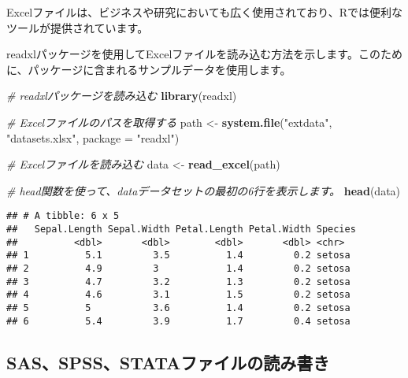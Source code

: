 \documentclass[
]{article}
\newenvironment{Shaded}{\begin{snugshade}}{\end{snugshade}}
\newcommand{\AttributeTok}[1]{\textcolor[rgb]{0.13,0.29,0.53}{#1}}
\newcommand{\CommentTok}[1]{\textcolor[rgb]{0.56,0.35,0.01}{\textit{#1}}}
\newcommand{\FunctionTok}[1]{\textcolor[rgb]{0.13,0.29,0.53}{\textbf{#1}}}
\newcommand{\NormalTok}[1]{#1}
\newcommand{\OtherTok}[1]{\textcolor[rgb]{0.56,0.35,0.01}{#1}}
\newcommand{\StringTok}[1]{\textcolor[rgb]{0.31,0.60,0.02}{#1}}
\begin{document}
Excelファイルは、ビジネスや研究においても広く使用されており、Rでは便利なツールが提供されています。

readxlパッケージを使用してExcelファイルを読み込む方法を示します。このために、パッケージに含まれるサンプルデータを使用します。

\begin{Shaded}
\begin{Highlighting}[]
\CommentTok{\# readxlパッケージを読み込む}
\FunctionTok{library}\NormalTok{(readxl)}

\CommentTok{\# Excelファイルのパスを取得する}
\NormalTok{path }\OtherTok{\textless{}{-}} \FunctionTok{system.file}\NormalTok{(}\StringTok{"extdata"}\NormalTok{, }\StringTok{"datasets.xlsx"}\NormalTok{, }\AttributeTok{package =} \StringTok{"readxl"}\NormalTok{)}

\CommentTok{\# Excelファイルを読み込む}
\NormalTok{data }\OtherTok{\textless{}{-}} \FunctionTok{read\_excel}\NormalTok{(path)}
\end{Highlighting}
\end{Shaded}

\begin{Shaded}
\begin{Highlighting}[]
\CommentTok{\# \textquotesingle{}head\textquotesingle{}関数を使って、\textquotesingle{}data\textquotesingle{}データセットの最初の6行を表示します。}
\FunctionTok{head}\NormalTok{(data)}
\end{Highlighting}
\end{Shaded}

\begin{verbatim}
## # A tibble: 6 x 5
##   Sepal.Length Sepal.Width Petal.Length Petal.Width Species
##          <dbl>       <dbl>        <dbl>       <dbl> <chr>  
## 1          5.1         3.5          1.4         0.2 setosa 
## 2          4.9         3            1.4         0.2 setosa 
## 3          4.7         3.2          1.3         0.2 setosa 
## 4          4.6         3.1          1.5         0.2 setosa 
## 5          5           3.6          1.4         0.2 setosa 
## 6          5.4         3.9          1.7         0.4 setosa
\end{verbatim}

\hypertarget{sasspssstataux30d5ux30a1ux30a4ux30ebux306eux8aadux307fux66f8ux304d}{%
\subsection{SAS、SPSS、STATAファイルの読み書き}\label{sasspssstataux30d5ux30a1ux30a4ux30ebux306eux8aadux307fux66f8ux304d}}
\end{document}
